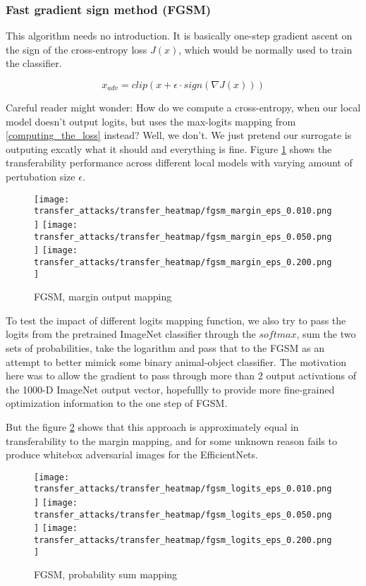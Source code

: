 \subsubsection{Fast gradient sign method (FGSM)}
This algorithm needs no introduction.
It is basically one-step gradient ascent on the sign of the cross-entropy loss $J(x)$, which would be normally used to train the classifier.

$$x_{adv} = clip(x + \epsilon \cdot sign(\nabla J(x)))$$


Careful reader might wonder: How do we compute a cross-entropy, when our local model doesn't output logits, but uses the max-logits mapping from \ref{computing_the_loss} instead? Well, we don't. We just pretend our surrogate is outputing excatly what it should and everything is fine. Figure \ref{fig:fgsm_margin} shows the transferability performance across different local models with varying amount of pertubation size $\epsilon$.

\begin{figure}[!htb]
  \texttt{[image: transfer\_attacks/transfer\_heatmap/fgsm\_margin\_eps\_0.010.png]}
\endminipage\hfill
{}
  \texttt{[image: transfer\_attacks/transfer\_heatmap/fgsm\_margin\_eps\_0.050.png]}
\endminipage\hfill
{}%
  \texttt{[image: transfer\_attacks/transfer\_heatmap/fgsm\_margin\_eps\_0.200.png]}
\endminipage
\caption{FGSM, margin output mapping}
\label{fig:fgsm_margin}
\end{figure}

To test the impact of different logits mapping function, we also try to pass the logits from the pretrained ImageNet classifier through the $softmax$, sum the two sets of probabilities, take the logarithm and pass that to the FGSM as an attempt to better mimick some binary animal-object classifier. The motivation here was to allow the gradient to pass through more than 2 output activations of the 1000-D ImageNet output vector, hopefullly to provide more fine-grained optimization information to the one step of FGSM.

But the figure \ref{fig:fgsm_prob_sum} shows that this approach is approximately equal in transferability to the margin mapping, and for some unknown reason fails to produce whitebox adversarial images for the EfficientNets.

\begin{figure}[!htb]
  \texttt{[image: transfer\_attacks/transfer\_heatmap/fgsm\_logits\_eps\_0.010.png]}
\endminipage\hfill
{}
  \texttt{[image: transfer\_attacks/transfer\_heatmap/fgsm\_logits\_eps\_0.050.png]}
\endminipage\hfill
{}%
  \texttt{[image: transfer\_attacks/transfer\_heatmap/fgsm\_logits\_eps\_0.200.png]}
\endminipage
\caption{FGSM, probability sum mapping}
\label{fig:fgsm_prob_sum}
\end{figure}


